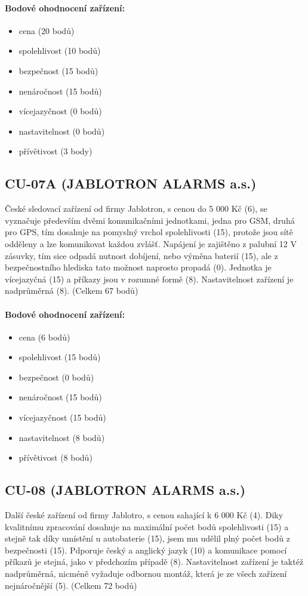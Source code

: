 \documentclass[FM,BP]{tulthesis}  %
\begin{document}
\paragraph{Bodové ohodnocení zařízení:}
\begin{itemize}
\item cena (20 bodů)
\item spolehlivost (10 bodů)
\item bezpečnost (15 bodů)
\item nenáročnost (15 bodů)
\item vícejazyčnost (0 bodů)
\item nastavitelnost (0 bodů)
\item přívětivost (3 body)
\end{itemize}

\subsection{CU-07A (JABLOTRON ALARMS a.s.)}
České sledovací zařízení od firmy Jablotron, s cenou do 5 000 Kč (6), se vyznačuje především dvěmi komunikačními jednotkami, jedna pro GSM, druhá pro GPS, tím dosahuje na pomyslný vrchol spolehlivosti (15), protože jsou sítě odděleny a lze komunikovat každou zvlášť. Napájení je zajištěno z palubní 12 V zásuvky, tím sice odpadá nutnost dobíjení, nebo výměna baterií (15), ale z bezpečnostního hlediska tato možnost naprosto propadá (0). Jednotka je vícejazyčná (15) a příkazy jsou v rozumné formě (8). Nastavitelnost zařízení je nadprůměrná (8). (Celkem 67 bodů)

\paragraph{Bodové ohodnocení zařízení:}
\begin{itemize}
\item cena (6 bodů)
\item spolehlivost (15 bodů)
\item bezpečnost (0 bodů)
\item nenáročnost (15 bodů)
\item vícejazyčnost (15 bodů)
\item nastavitelnost (8 bodů)
\item přívětivost (8 bodů)
\end{itemize}

\subsection{CU-08 (JABLOTRON ALARMS a.s.)}
Další české zařízení od firmy Jablotro, s cenou sahající k 6 000 Kč (4). Diky kvalitnímu zpracování dosahuje na maximální počet bodů spolehlivosti (15) a stejně tak díky umístění u autobaterie (15), jsem mu udělil plný počet bodů z bezpečnosti (15). Pdporuje český a anglický jazyk (10) a komunikace pomocí příkazů je stejná, jako v předchozím případě (8). Nastavitelnost zařízení je taktéž nadprůměrná, nicméně vyžaduje odbornou montáž, která je ze všech zařízení nejnáročnější (5). (Celkem 72 bodů)
\end{document}
